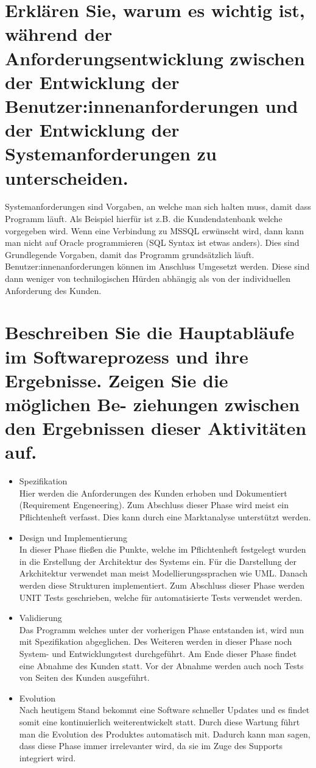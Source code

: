 \documentclass[12pt]{article}
\begin{document}
\section{Erklären Sie, warum es wichtig ist, während der Anforderungsentwicklung zwischen der Entwicklung der
Benutzer:innenanforderungen und der Entwicklung der Systemanforderungen zu unterscheiden.}
Systemanforderungen sind Vorgaben, an welche man sich halten muss, damit dass Programm läuft. Als Beispiel hierfür ist z.B. die Kundendatenbank welche vorgegeben wird. Wenn eine Verbindung zu MSSQL erwünscht wird, dann kann man nicht auf Oracle programmieren (SQL Syntax ist etwas anders). Dies sind Grundlegende Vorgaben, damit das Programm grundsätzlich läuft. Benutzer:innenanforderungen können im Anschluss Umgesetzt werden. Diese sind dann weniger von technilogischen Hürden abhängig als von der individuellen Anforderung des Kunden.

\section{Beschreiben Sie die Hauptabläufe im Softwareprozess und ihre Ergebnisse. Zeigen Sie die möglichen Be-
ziehungen zwischen den Ergebnissen dieser Aktivitäten auf.}
\begin{itemize}
 \item Spezifikation\\
 Hier werden die Anforderungen des Kunden erhoben und Dokumentiert (Requirement Engeneering). Zum Abschluss dieser Phase wird meist ein Pflichtenheft verfasst. Dies kann durch eine Marktanalyse unterstützt werden.
 \item Design und Implementierung\\
 In dieser Phase fließen die Punkte, welche im Pflichtenheft festgelegt wurden in die Erstellung der Architektur des Systems ein. Für die Darstellung der Arkchitektur verwendet man meist Modellierungssprachen wie UML. Danach werden diese Strukturen implementiert. Zum Abschluss dieser Phase werden UNIT Tests geschrieben, welche für automatisierte Tests verwendet werden.
 \item Validierung\\
 Das Programm welches unter der vorherigen Phase entstanden ist, wird nun mit Spezifikation abgeglichen. Des Weiteren werden in dieser Phase noch System- und Entwicklungstest durchgeführt. Am Ende dieser Phase findet eine Abnahme des Kunden statt. Vor der Abnahme werden auch noch Tests von Seiten des Kunden ausgeführt.
 \item Evolution\\
 Nach heutigem Stand bekommt eine Software schneller Updates und es findet somit eine kontinuierlich weiterentwickelt statt. Durch diese Wartung führt man die Evolution des Produktes automatisch mit. Dadurch kann man sagen, dass diese Phase immer irrelevanter wird, da sie im Zuge des Supports integriert wird.
\end{itemize}
\pagebreak
\end{document}
